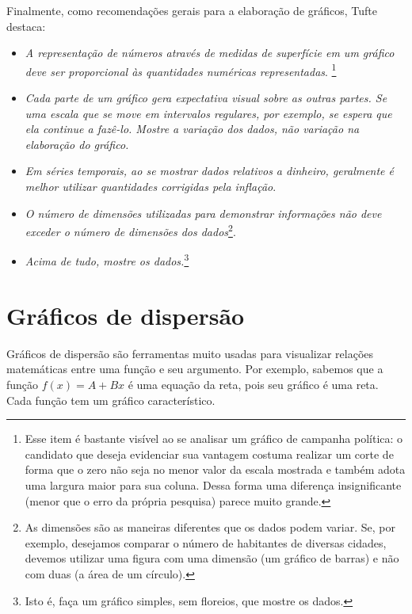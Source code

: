 Finalmente, como recomendações gerais para a elaboração de gráficos, Tufte destaca:
\begin{itemize}
	\item \emph{A representação de números através de medidas de superfície em um gráfico deve ser proporcional às quantidades numéricas representadas}. \footnote[][-3cm]{Esse item é bastante visível ao se analisar um gráfico de campanha política: o candidato que deseja evidenciar sua vantagem costuma realizar um corte de forma que o zero não seja no menor valor da escala mostrada e também adota uma largura maior para sua coluna. Dessa forma uma diferença insignificante (menor que o erro da própria pesquisa) parece muito grande.}
	\item \emph{Cada parte de um gráfico gera expectativa visual sobre as outras partes. Se uma escala que se move em intervalos regulares, por exemplo, se espera que ela continue a fazê-lo. Mostre a variação dos dados, não variação na elaboração do gráfico.}
	\item \emph{Em séries temporais, ao se mostrar dados relativos a dinheiro, geralmente é melhor utilizar quantidades corrigidas pela inflação}.
	\item \emph{O número de dimensões utilizadas para demonstrar informações não deve exceder o número de dimensões dos dados}\footnote{As dimensões são as maneiras diferentes que os dados podem variar. Se, por exemplo, desejamos comparar o número de habitantes de diversas cidades, devemos utilizar uma figura com uma dimensão (um gráfico de barras) e não com duas (a área de um círculo).}.
	\item \emph{Acima de tudo, mostre os dados.}\footnote{Isto é, faça um gráfico simples, sem floreios, que mostre os dados.}
\end{itemize}


\section{Gráficos de dispersão}

Gráficos de dispersão são ferramentas muito usadas para visualizar relações matemáticas entre uma função e seu argumento. Por exemplo, sabemos que a função $f(x) = A + Bx$ é uma equação da reta, pois seu gráfico é uma reta. Cada função tem um gráfico característico. 


